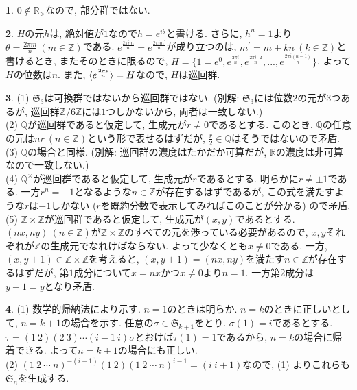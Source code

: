 \documentclass{amsart}
\theoremstyle{definition}
\newtheorem{ans}{}
\numberwithin{ans}{subsection}
\newcommand{\Z}[1]{\mathbb{Z}/#1\mathbb{Z}}
\DeclarePairedDelimiter{\gen}{\langle}{\rangle}
\begin{document}
\begin{ans}
  $0 \notin \mathbb{R}_>$なので, 部分群ではない.
\end{ans}

\begin{ans}
  $H$の元$h$は, 絶対値が$1$なので$h = e^{i\theta}$と書ける.
  さらに, $h^n = 1$より$\theta = \frac{2\pi m}{n}\ (m \in \mathbb{Z})$である.
  $e^\frac{2\pi im}{n} = e^\frac{2\pi i m^\prime}{n}$が成り立つのは,
  $m^\prime = m + kn\ (k \in \mathbb{Z})$と書けるとき, またそのときに限るので,
  $H = \{1 = e^0, e^\frac{2\pi i}{n}, e^\frac{2\pi i \cdot 2}{n},..., e^\frac{2\pi i(n - 1)}{n}\}$.
  よって$H$の位数は$n$.
  また, $\gen{e^\frac{2\pi i}{n}} = H$なので, $H$は巡回群.
\end{ans}

\begin{ans}
  (1) $\mathfrak{S}_3$は可換群ではないから巡回群ではない.
  (別解: $\mathfrak{S}_3$には位数$2$の元が$3$つあるが, 巡回群$\Z{6}$には$1$つしかないから, 両者は一致しない.) \\
  (2) $\mathbb{Q}$が巡回群であると仮定して, 生成元が$r \neq 0$であるとする.
  このとき, $\mathbb{Q}$の任意の元は$nr\ (n \in \mathbb{Z})$という形で表せるはずだが, $\frac{r}{2} \in \mathbb{Q}$はそうではないので矛盾. \\
  (3) $\mathbb{Q}$の場合と同様. (別解: 巡回群の濃度はたかだか可算だが, $\mathbb{R}$の濃度は非可算なので一致しない.) \\
  (4) $\mathbb{Q}^\times$が巡回群であると仮定して, 生成元が$r$であるとする.
  明らかに$r \neq \pm 1$である. 一方$r^{n} = -1$となるような$n \in \mathbb{Z}$が存在するはずであるが,
  この式を満たすような$r$は$-1$しかない ($r$を既約分数で表示してみればこのことが分かる) ので矛盾.
  \\
  (5) $\mathbb{Z} \times \mathbb{Z}$が巡回群であると仮定して, 生成元が$(x, y)$であるとする.
  $(nx, ny)\ (n \in \mathbb{Z})$が$\mathbb{Z} \times \mathbb{Z}$のすべての元を渉っている必要があるので,
  $x, y$それぞれが$\mathbb{Z}$の生成元でなれけばならない. よって少なくとも$x \neq 0$である.
  一方, $(x, y + 1) \in \mathbb{Z} \times \mathbb{Z}$を考えると,
  $(x, y + 1) = (nx, ny)$を満たす$n \in \mathbb{Z}$が存在するはずだが,
  第$1$成分について$x = nx$かつ$x \neq 0$より$n = 1$. 一方第$2$成分は$y + 1 = y$となり矛盾.
\end{ans}

\begin{ans}
  (1) 数学的帰納法により示す. $n = 1$のときは明らか.
  $n = k$のときに正しいとして, $n = k + 1$の場合を示す.
  任意の$\sigma \in \mathfrak{S}_{k + 1}$をとり.
  $\sigma(1) = i$であるとする.
  $\tau = (1\ 2)(2\ 3)\cdots(i-1\ i)\sigma$とおけば$\tau(1) = 1$であるから,
  $n = k$の場合に帰着できる. よって$n = k + 1$の場合にも正しい. \\
  (2) $(1\ 2\ \cdots\ n)^{-(i-1)}(1\ 2)(1\ 2\ \cdots\ n)^{i-1} = (i\ i + 1)$なので,
  (1) よりこれらも$\mathfrak{S}_n$を生成する.
\end{ans}
\end{document}
